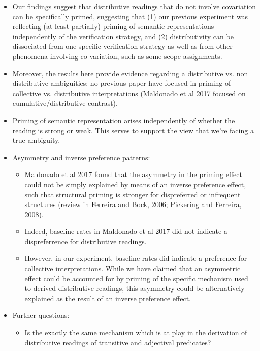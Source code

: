 \documentclass[a4paper]{article}
\begin{document}
\begin{itemize}

\item Our findings suggest that distributive readings that do not involve covariation can be specifically primed, suggesting that (1) our previous experiment was reflecting (at least partially) priming of semantic representations independently of the verification strategy, and (2) distributivity can be dissociated from one specific verification strategy as well as from other phenomena involving co-variation, such as some scope assignments.  

\item Moreover, the results here provide evidence regarding a distributive vs. non distributive ambiguities: no previous paper have focused in priming of collective vs. distributive interpretations (Maldonado et al 2017 focused on cumulative/distributive contrast).

\item Priming of semantic representation arises independently of whether the reading is strong or weak. This serves to support the view that we’re facing a true ambiguity.  

\item Asymmetry and inverse preference patterns: 

\begin{itemize}
\item Maldonado et al 2017 found that the asymmetry in the priming effect could not be simply explained by means of an inverse preference effect, such that structural priming is stronger for dispreferred or infrequent structures (review in Ferreira and Bock, 2006; Pickering and Ferreira, 2008). 
\item Indeed, baseline rates in Maldonado et al 2017 did not indicate a dispreferrence for distributive readings. 

\item However, in our experiment, baseline rates did indicate a preference for collective interpretations. While we have claimed that an asymmetric effect could be accounted for by priming of the specific mechanism used to derived distributive readings, this asymmetry could be alternatively explained as the result of an inverse preference effect. 

\end{itemize}



\item Further questions:
\begin{itemize}
\item Is the exactly the same mechanism which is at play in the derivation of distributive readings of transitive and adjectival predicates?

\end{itemize}


\end{itemize}
\end{document}
